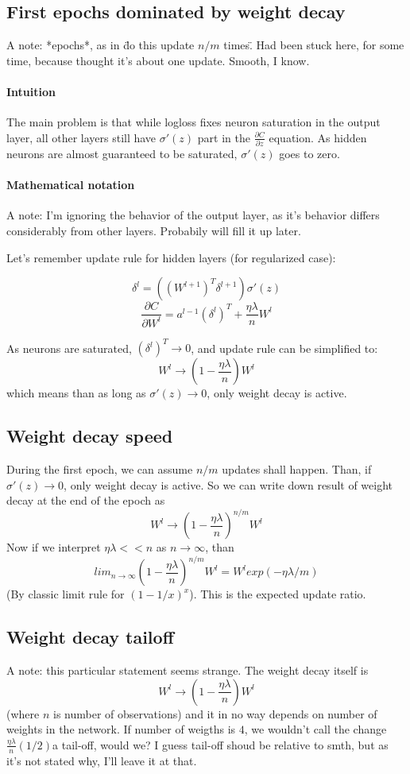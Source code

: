 \documentclass{article}
\begin{document}
\subsection{First epochs dominated by weight decay}

A note: *epochs*, as in \"do this update $n/m$ times\".
Had been stuck here, for some time, because thought it's about one update. Smooth, I know.

\paragraph{Intuition}
The main problem is that while logloss fixes neuron saturation in the output layer,
all other layers still have $\sigma'(z)$ part in the $\frac{\partial C}{\partial z}$ equation.
As hidden neurons are almost guaranteed to be saturated, $\sigma'(z)$ goes to zero.
\paragraph{Mathematical notation}

A note: I'm ignoring the behavior of the output layer, as it's behavior differs considerably from other layers.
Probabily will fill it up later.

Let's remember update rule for hidden layers (for regularized case):

$$\delta^l = ((W^{l+1})^T \delta^{l+1}) \sigma'(z)$$
$$\frac{\partial C}{\partial W^l} = a^{l-1} (\delta^l)^T + \frac{\eta \lambda}{n} W^l$$

As neurons are saturated, $(\delta^l)^T \rightarrow 0$, and update rule can be simplified to:
$$W^l \rightarrow (1 - \frac{\eta \lambda}{n})W^l$$
which means than as long as $\sigma'(z) \rightarrow 0$, only weight decay is active.

\subsection{Weight decay speed}

During the first epoch, we can assume $n/m$ updates shall happen.
Than, if $\sigma'(z) \rightarrow 0$, only weight decay is active.
So we can write down result of weight decay at the end of the epoch as
$$W^l \rightarrow (1 - \frac{\eta \lambda}{n})^{n/m}W^l$$
Now if we interpret $\eta \lambda << n$ as $n \rightarrow \infty$, than
$$lim_{n \rightarrow \infty} (1 - \frac{\eta \lambda}{n})^{n/m}W^l = W^l exp(-\eta \lambda /m)$$
(By classic limit rule for $(1-1/x)^{x}$).
This is the expected update ratio.

\subsection{Weight decay tailoff}

A note: this particular statement seems strange. The weight decay itself is 
$$W^l \rightarrow (1 - \frac{\eta \lambda}{n})W^l$$
(where $n$ is number of observations) and it in no way depends on number of weights in the network.
If number of weigths is $4$, we wouldn't call the change $\frac{\eta \lambda}{n} (1/2)$a tail-off, would we?
I guess tail-off shoud be relative to smth, but as it's not stated why, I'll leave it at that.
\end{document}
